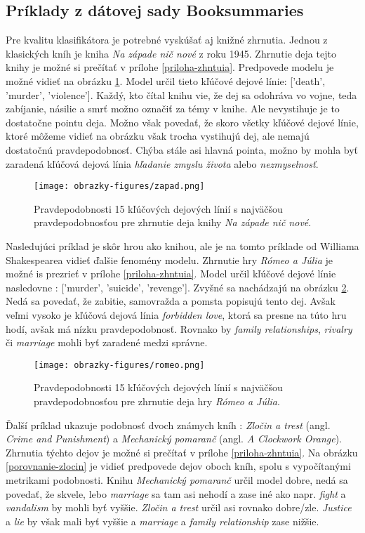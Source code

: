 \pagebreak
\subsection*{Príklady z dátovej sady Booksummaries}

Pre kvalitu klasifikátora je potrebné vyskúšať aj knižné zhrnutia. Jednou z klasických kníh je kniha \textit{Na západe nič nové} z roku 1945. Zhrnutie deja tejto knihy je možné si prečítať v prílohe \ref{priloha-zhntuia}. Predpovede modelu je možné vidieť na obrázku \ref{zapad}. Model určil tieto kľúčové dejové línie: ['death', 'murder', 'violence']. Každý, kto čítal knihu vie, že dej sa odohráva vo vojne, teda zabíjanie, násilie a smrť možno označiť za témy v knihe. Ale nevystihuje je to dostatočne pointu deja. Možno však povedať, že skoro všetky kľúčové dejové línie, ktoré môžeme vidieť na obrázku však trocha vystihujú dej, ale nemajú dostatočnú pravdepodobnosť. Chýba stále asi hlavná pointa, možno by mohla byť zaradená kľúčová dejová línia \textit{hľadanie zmyslu života} alebo \textit{nezmyselnosť}. 

\begin{figure}[ht!]
	\centering
	\texttt{[image: obrazky-figures/zapad.png]}
	\caption{Pravdepodobnosti 15 kľúčových dejových línií s najväčšou pravdepodobnosťou pre zhrnutie deja knihy \textit{Na západe nič nové}.}
	\label{zapad}
\end{figure}

\pagebreak
Nasledujúci príklad je skôr hrou ako knihou, ale je na tomto príklade od Williama Shakespearea vidieť ďalšie fenomény modelu. Zhrnutie hry \textit{Rómeo a Júlia} je možné is prezrieť v prílohe \ref{priloha-zhntuia}. Model určil kľúčové dejové línie nasledovne : ['murder', 'suicide', 'revenge']. Zvyšné sa nachádzajú na obrázku \ref{romeo}. Nedá sa povedať, že zabitie, samovražda a pomsta popisujú tento dej. Avšak veľmi vysoko je kľúčová dejová línia \textit{forbidden love}, ktorá sa presne na túto hru hodí, avšak má nízku pravdepodobnosť. Rovnako by \textit{family relationships},  \textit{rivalry} či \textit{marriage} mohli byť zaradené medzi správne.

\begin{figure}[ht!]
	\centering
	\texttt{[image: obrazky-figures/romeo.png]}
	\caption{Pravdepodobnosti 15 kľúčových dejových línií s najväčšou pravdepodobnosťou pre zhrnutie deja hry \textit{Rómeo a Júlia}.}
	\label{romeo}
\end{figure}


Ďalší príklad ukazuje podobnosť dvoch známych kníh : \textit{Zločin a trest} (angl. \textit{Crime and Punishment}) a \textit{Mechanický pomaranč} (angl. \textit{A Clockwork Orange}). Zhrnutia týchto dejov je možné si prečítať v prílohe \ref{priloha-zhntuia}. Na obrázku \ref{porovnanie-zlocin} je vidieť predpovede dejov oboch kníh, spolu s vypočítanými metrikami podobnosti. Knihu \textit{Mechanický pomaranč} určil model dobre, nedá sa povedať, že skvele, lebo \textit{marriage} sa tam asi nehodí a zase iné ako napr. \textit{fight} a \textit{vandalism} by mohli byť vyššie. \textit{Zločin a trest} určil asi rovnako dobre/zle. \textit{Justice} a \textit{lie} by však mali byť vyššie a \textit{marriage} a \textit{family relationship} zase nižšie. 


